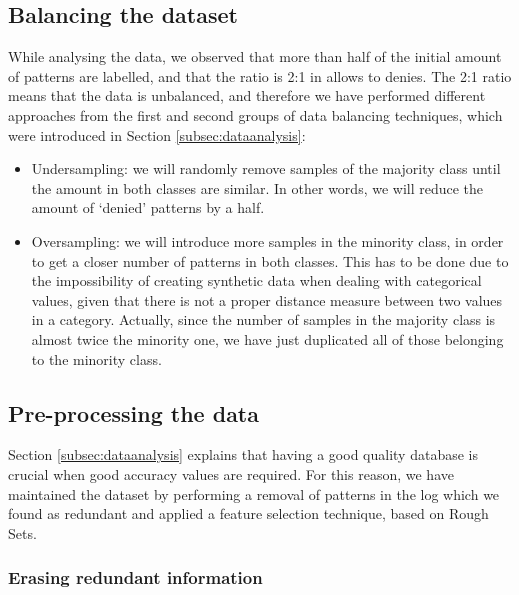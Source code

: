 \documentclass{llncs}
\begin{document}
%
\subsection{Balancing the dataset}
\label{subsec:balancing}

While analysing the data, we observed that more than half of the
initial amount of patterns are labelled, and that the ratio is 2:1 in
allows to denies. The 2:1 ratio means that the data is unbalanced, and
therefore we have performed different approaches from the first and
second groups of data balancing techniques, which were introduced in
Section \ref{subsec:dataanalysis}:

\begin{itemize}
\item Undersampling: we will randomly remove samples of the majority class until the amount in both classes are similar. In other words, we will reduce the amount of `denied' patterns by a half.
\item Oversampling: we will introduce more samples in the minority class, in order to get a closer number of patterns in both classes. This has to be done due to the impossibility of creating synthetic data when dealing with categorical values, given that there is not a proper distance measure between two values in a category. Actually, since the number of samples in the majority class is almost twice the minority one, we have just duplicated all of those belonging to the minority class.
\end{itemize}

%
\subsection{Pre-processing the data}
\label{subsec:preprocessing}

Section \ref{subsec:dataanalysis} explains that having a good quality database is crucial when good accuracy values are required. For this reason, we have maintained the dataset by performing a removal of patterns in the log which we found as redundant and applied a feature selection technique, based on Rough Sets.

%
\subsubsection{Erasing redundant information}
\label{subsec:duplicateddata}
\end{document}
